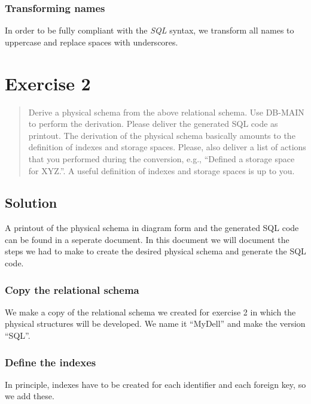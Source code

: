 \documentclass[11pt]{article}
\begin{document}
\subsubsection*{Transforming names}

In order to be fully compliant with the \emph{SQL} syntax, we transform all names to uppercase and replace spaces with underscores. 


\newpage

\section{Exercise 2}

\begin{quote}
Derive a physical schema from the above relational schema. Use DB-MAIN to perform the derivation. Please deliver the generated SQL code as printout. The derivation of the physical schema basically amounts to the definition of indexes and storage spaces. Please, also deliver a list of actions that you performed during the conversion, e.g., ``Defined a storage space for XYZ.''. A useful definition of indexes and storage spaces is up to you.
\end{quote}

\subsection*{Solution}

A printout of the physical schema in diagram form and the generated SQL code can be found in a seperate document. In this document we will document the steps we had to make to create the desired physical schema and generate the SQL code.


\subsubsection*{Copy the relational schema}

We make a copy of the relational schema we created for exercise 2 in which the physical structures will be developed. We name it ``MyDell'' and make the version ``SQL''.


\subsubsection*{Define the indexes}

In principle, indexes have to be created for each identifier and each foreign key, so we add these.
\end{document}
